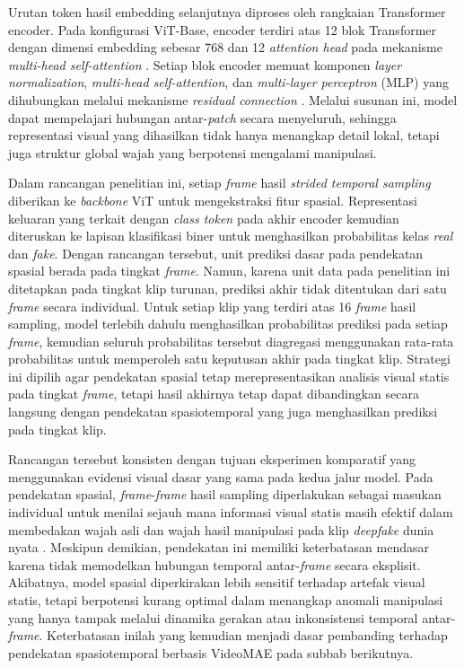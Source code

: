 Urutan token hasil embedding selanjutnya diproses oleh rangkaian Transformer encoder. Pada konfigurasi ViT-Base, encoder terdiri atas 12 blok Transformer dengan dimensi embedding sebesar 768 dan 12 \textit{attention head} pada mekanisme \textit{multi-head self-attention} \cite{dosovitskiy2021imageworth16x16words}. Setiap blok encoder memuat komponen \textit{layer normalization}, \textit{multi-head self-attention}, dan \textit{multi-layer perceptron} (MLP) yang dihubungkan melalui mekanisme \textit{residual connection} \cite{dosovitskiy2021imageworth16x16words}. Melalui susunan ini, model dapat mempelajari hubungan antar-\textit{patch} secara menyeluruh, sehingga representasi visual yang dihasilkan tidak hanya menangkap detail lokal, tetapi juga struktur global wajah yang berpotensi mengalami manipulasi. \par

Dalam rancangan penelitian ini, setiap \textit{frame} hasil \textit{strided temporal sampling} diberikan ke \textit{backbone} ViT untuk mengekstraksi fitur spasial. Representasi keluaran yang terkait dengan \textit{class token} pada akhir encoder kemudian diteruskan ke lapisan klasifikasi biner untuk menghasilkan probabilitas kelas \textit{real} dan \textit{fake}. Dengan rancangan tersebut, unit prediksi dasar pada pendekatan spasial berada pada tingkat \textit{frame}. Namun, karena unit data pada penelitian ini ditetapkan pada tingkat klip turunan, prediksi akhir tidak ditentukan dari satu \textit{frame} secara individual. Untuk setiap klip yang terdiri atas 16 \textit{frame} hasil sampling, model terlebih dahulu menghasilkan probabilitas prediksi pada setiap \textit{frame}, kemudian seluruh probabilitas tersebut diagregasi menggunakan rata-rata probabilitas untuk memperoleh satu keputusan akhir pada tingkat klip. Strategi ini dipilih agar pendekatan spasial tetap merepresentasikan analisis visual statis pada tingkat \textit{frame}, tetapi hasil akhirnya tetap dapat dibandingkan secara langsung dengan pendekatan spasiotemporal yang juga menghasilkan prediksi pada tingkat klip. \par

Rancangan tersebut konsisten dengan tujuan eksperimen komparatif yang menggunakan evidensi visual dasar yang sama pada kedua jalur model. Pada pendekatan spasial, \textit{frame}-\textit{frame} hasil sampling diperlakukan sebagai masukan individual untuk menilai sejauh mana informasi visual statis masih efektif dalam membedakan wajah asli dan wajah hasil manipulasi pada klip \textit{deepfake} dunia nyata \cite{Zi2024,chu2025reducedspatialdependencygeneral}. Meskipun demikian, pendekatan ini memiliki keterbatasan mendasar karena tidak memodelkan hubungan temporal antar-\textit{frame} secara eksplisit. Akibatnya, model spasial diperkirakan lebih sensitif terhadap artefak visual statis, tetapi berpotensi kurang optimal dalam menangkap anomali manipulasi yang hanya tampak melalui dinamika gerakan atau inkonsistensi temporal antar-\textit{frame}. Keterbatasan inilah yang kemudian menjadi dasar pembanding terhadap pendekatan spasiotemporal berbasis VideoMAE pada subbab berikutnya. \par

